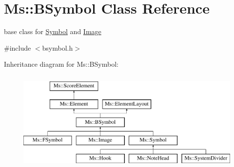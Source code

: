 \hypertarget{class_ms_1_1_b_symbol}{}\section{Ms\+:\+:B\+Symbol Class Reference}
\label{class_ms_1_1_b_symbol}


base class for \hyperlink{class_ms_1_1_symbol}{Symbol} and \hyperlink{class_ms_1_1_image}{Image}  




{\ttfamily \#include $<$bsymbol.\+h$>$}

Inheritance diagram for Ms\+:\+:B\+Symbol\+:\begin{figure}[H]
\begin{center}
\leavevmode
\includegraphics[height=5.000000cm]{class_ms_1_1_b_symbol}
\end{center}
\end{figure}
